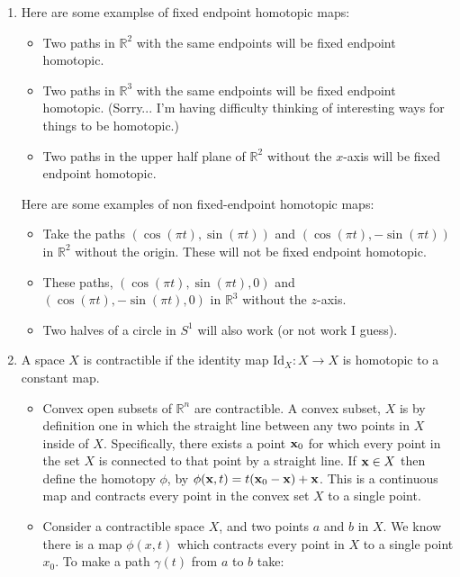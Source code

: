 \documentclass[12pt]{report}
\begin{document}
\begin{enumerate}
\item Here are some examplse of fixed endpoint homotopic maps:
\begin{itemize}
  \item Two paths in $\mathbb{R}^2$ with the same endpoints will be fixed endpoint homotopic.
  \item Two paths in $\mathbb{R}^3$ with the same endpoints will be fixed endpoint homotopic.
        (Sorry... I'm having difficulty thinking of interesting ways for things to be homotopic.)
  \item Two paths in the upper half plane of $\mathbb{R}^2$ without the $x$-axis will be fixed endpoint homotopic.
\end{itemize}

Here are some examples of non fixed-endpoint homotopic maps:
\begin{itemize}
  \item Take the paths $(\cos(\pi t),\sin(\pi t)) $ and $(\cos(\pi t), -\sin(\pi t))$ in $\mathbb{R}^2$ without the
        origin. These will not be fixed endpoint homotopic.
  \item These paths, $(\cos(\pi t),\sin(\pi t),0)$ and $(\cos(\pi t), -\sin(\pi t),0)$ in $\mathbb{R}^3$ without
        the $z$-axis.
  \item Two halves of a circle in $S^1$ will also work (or not work I guess).
\end{itemize}


\item A space $X$ is contractible if the identity map $\textrm{Id}_X : X \to X$ is homotopic to a constant map.
\begin{itemize}
  \item Convex open subsets of $\mathbb{R}^n$ are contractible. A convex subset, $X$ is by definition one in which the
  straight line between any two points in $X$ inside of $X$. Specifically, there exists a point ${\bf x}_0$ for which
  every point in the set $X$ is connected to that point by a straight line. If ${\bf x} \in X$ then define the homotopy
  $\phi$, by $\phi({\bf x},t) = t({\bf x}_0 - {\bf x}) + {\bf x}$. This is a continuous map and contracts every point in
  the convex set $X$ to a single point.

  \item Consider a contractible space $X$, and two points $a$ and $b$ in $X$. We know there is a map $\phi(x,t)$ which
  contracts every point in $X$ to a single point $x_0$. To make a path $\gamma(t)$ from $a$ to $b$ take:


\end{itemize}
\end{enumerate}
\end{document}
